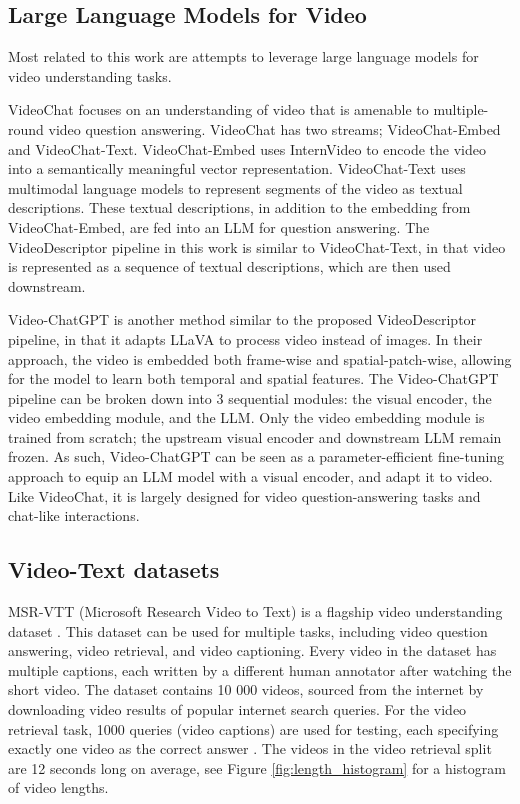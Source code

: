\subsection{Large Language Models for Video}

Most related to this work are attempts to leverage large language models for video understanding tasks.

VideoChat \cite{videochat} focuses on an understanding of video that is amenable to multiple-round video question answering.
VideoChat has two streams; VideoChat-Embed and VideoChat-Text.
VideoChat-Embed uses InternVideo to encode the video into a semantically meaningful vector representation.
VideoChat-Text uses multimodal language models to represent segments of the video as textual descriptions. 
These textual descriptions, in addition to the embedding from VideoChat-Embed, are fed into an LLM for question answering.
The VideoDescriptor pipeline in this work is similar to VideoChat-Text, in that video is represented as a sequence of textual descriptions, which are then used downstream.

Video-ChatGPT \cite{videochatgpt} is another method similar to the proposed VideoDescriptor pipeline, in that it adapts LLaVA to process video instead of images.
In their approach, the video is embedded both frame-wise and spatial-patch-wise, allowing for the model to learn both temporal and spatial features.
The Video-ChatGPT pipeline can be broken down into 3 sequential modules: the visual encoder, the video embedding module, and the LLM.
Only the video embedding module is trained from scratch; the upstream visual encoder and downstream LLM remain frozen.
As such, Video-ChatGPT can be seen as a parameter-efficient fine-tuning approach to equip an LLM model with a visual encoder, and adapt it to video.
Like VideoChat, it is largely designed for video question-answering tasks and chat-like interactions.

\subsection{Video-Text datasets}
MSR-VTT (Microsoft Research Video to Text) is a flagship video understanding dataset \cite{msr-vtt}.
This dataset can be used for multiple tasks, including video question answering, video retrieval, and video captioning.
Every video in the dataset has multiple captions, each written by a different human annotator after watching the short video.
The dataset contains 10 000 videos, sourced from the internet by downloading video results of popular internet search queries.
For the video retrieval task, 1000 queries (video captions) are used for testing, each specifying exactly one video as the correct answer \cite{jsfusion}.
The videos in the video retrieval split are 12 seconds long on average, see Figure \ref{fig:length_histogram} for a histogram of video lengths.

